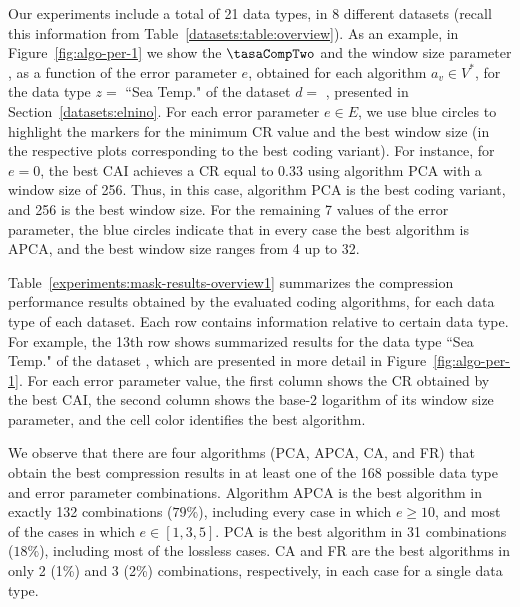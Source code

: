 Our experiments include a total of 21 data types, in 8 different datasets (recall this information from Table~\ref{datasets:table:overview}). As an example, in Figure~\ref{fig:algo-per-1} we show the $\tasaCompTwo$ and the window size parameter \WGlobal, as a function of the error parameter $e$, obtained for each algorithm $a_v \in V^{*}$, for the data type $z=$ ``Sea Temp." of the dataset $d=$ \datasetelnino, presented in Section~\ref{datasets:elnino}. For each error parameter $e \in E$, we use blue circles to highlight the markers for the minimum CR value and the best window size (in the respective plots corresponding to the best coding variant). For instance, for $e=0$, the best CAI achieves a CR equal to $0.33$ using algorithm PCA with a window size of 256. Thus, in this case, algorithm PCA is the best coding variant, and 256 is the best window size. For the remaining 7 values of the error parameter, the blue circles indicate that in every case the best algorithm is APCA, and the best window size ranges from 4 up to 32.


\clearpage




\clearpage


Table~\ref{experiments:mask-results-overview1} summarizes the compression performance results obtained by the evaluated coding algorithms, for each data type of each dataset. Each row contains information relative to certain data type. For example, the 13th row shows summarized results for the data type ``Sea Temp." of the dataset \datasetelnino, which are presented in more detail in Figure~\ref{fig:algo-per-1}. For each error parameter value, the first column shows the CR obtained by the best CAI, the second column shows the base-2 logarithm of its window size parameter, and the cell color identifies the best algorithm.
\vspace{+5pt}





We observe that there are four algorithms (PCA, APCA, CA, and FR) that obtain the best compression results in at least one of the 168 possible data type and error parameter combinations. Algorithm APCA is the best algorithm in exactly 132 combinations ($79\%$), including every case in which $e \geq 10$, and most of the cases in which $e \in [1, 3, 5]$. PCA is the best algorithm in 31 combinations ($18\%$), including most of the lossless cases. CA and FR are the best algorithms in only 2 (1\%) and 3 (2\%) combinations, respectively, in each case for a single data type.



